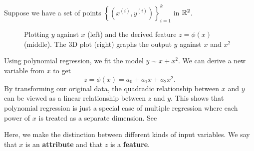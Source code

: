\begin{example}
    Suppose we have a set of points \(\left\{\left(x^{(i)}, y^{(i)}\right)\right\}_{i=1}^{k}\) in \(\mathbb{R}^2\).
    \begin{figure}
        \centering
        
        \caption{Plotting \(y\) against \(x\) (left) and the derived feature \(z = \phi(x)\) (middle). The 3D plot (right) graphs the output \(y\) against \(x\) and \(x^2\)}
        \label{fig:feature-map}
    \end{figure}
    Using polynomial regression, we fit the model \(y \sim x + x^2\).
    We can derive a new variable from \(x\) to get \[z = \phi(x) = a_0 + a_1 x + a_2 x^2.\]
    By transforming our original data, the quadradic relationship between \(x\) and \(y\) can be viewed as a linear relationship between \(z\) and \(y\).
    This shows that polynomial regression is just a special case of multiple regression where each power of \(x\) is treated as a separate dimension.
    See 

    Here, we make the distinction between different kinds of input variables.
    We say that \(x\) is an \textbf{attribute} and that \(z\) is a \textbf{feature}.
\end{example}